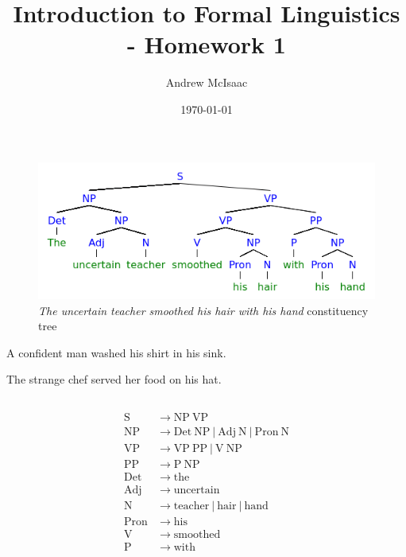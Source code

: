\documentclass{article}
\author{Andrew McIsaac}
\title{Introduction to Formal Linguistics - Homework 1}
\date{\today}
\begin{document}
\maketitle

\section{}
\subsection{}

\begin{figure}[h!]
	\includegraphics[width=\linewidth]{1a.png}
	\caption{\textit{The uncertain teacher smoothed his hair with his hand}
	constituency tree}
	\label{fig:1a}
\end{figure}

A confident man washed his shirt in his sink.

The strange chef served her food on his hat.

\subsection{}
\begin{align*}
	\mathrm{S} &\rightarrow \mathrm{NP~VP} \\
	\mathrm{NP} &\rightarrow \mathrm{Det~NP~|~Adj~N~|~Pron~N}\\
	\mathrm{VP} &\rightarrow \mathrm{VP~PP~|~V~NP}\\
	\mathrm{PP} &\rightarrow \mathrm{P~NP}\\
	\mathrm{Det} &\rightarrow \mathrm{the}\\
	\mathrm{Adj} &\rightarrow \mathrm{uncertain}\\
	\mathrm{N} &\rightarrow \mathrm{teacher~|~hair~|~hand}\\
	\mathrm{Pron} &\rightarrow \mathrm{his}\\
	\mathrm{V} &\rightarrow \mathrm{smoothed}\\
	\mathrm{P} &\rightarrow \mathrm{with}
\end{align*}
\end{document}
